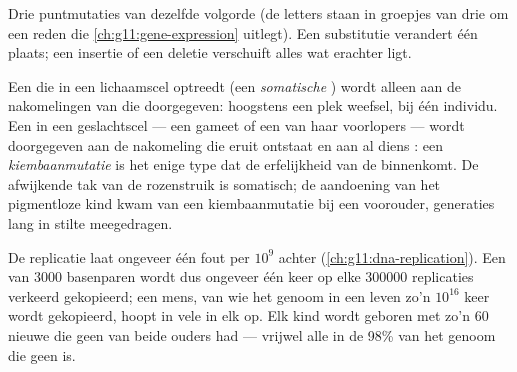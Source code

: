 \begin{omfigure}

{\small Drie puntmutaties van dezelfde volgorde (de letters staan in
groepjes van drie om een reden die
\cref{ch:g11:gene-expression} uitlegt). Een substitutie verandert één
plaats; een insertie of een deletie verschuift alles wat erachter ligt.}
\end{omfigure}

\begin{proposition}\label{prop:g11:mutations:where}
Een  die in een lichaamscel optreedt (een \emph{somatische
}) wordt alleen aan de nakomelingen van die  doorgegeven:
hoogstens een plek weefsel, bij één individu. Een  in een
geslachtscel --- een gameet of een van haar voorlopers --- wordt
doorgegeven aan de nakomeling die eruit ontstaat en aan al diens :
een \emph{kiembaanmutatie} is het enige type dat de erfelijkheid van de
 binnenkomt. De afwijkende tak van de rozenstruik is somatisch; de
aandoening van het pigmentloze kind kwam van een kiembaanmutatie bij een
voorouder, generaties lang in stilte meegedragen.
\end{proposition}
\admitted

\begin{example}\label{ex:g11:mutations:frequency}
De replicatie laat ongeveer één fout per $10^9$  achter
(\cref{ch:g11:dna-replication}). Een  van $\num{3000}$ basenparen
wordt dus ongeveer één keer op elke $\num{300000}$ replicaties verkeerd
gekopieerd; een mens, van wie het genoom in een leven zo'n $10^{16}$ keer
wordt gekopieerd, hoopt in vele   in elk  op. Elk kind
wordt geboren met zo'n 60 nieuwe  die geen van beide ouders had
--- vrijwel alle in de 98\% van het genoom die geen  is.
\end{example}

